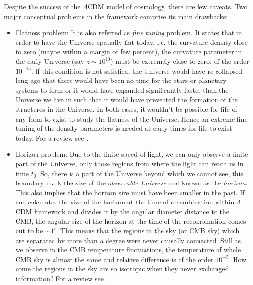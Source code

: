 Despite the success of the $\Lambda$CDM model of cosmology, there are few caveats.
Two major conceptual problems in the framework comprise its main drawbacks:

\begin{itemize}
	\item Flatness problem: It is also referred as {\it fine tuning} problem. It 
				states that in order to have the Universe spatially flat today, i.e.
				the curvature density close to zero (maybe within a margin of
				few percent), the curvature parameter in the early Universe (say 
				$z\sim10^{10}$) must be extremely close to zero, of the order $10^{-15}$.
				If this condition is not satisfied, the Universe would have re-collapsed
				long ago that there would have been no time for the stars or 
				planetary systems to form
				or it would have expanded significantly faster than the Universe
				we live in such that it would have prevented the formation of the structures
				in the Universe. In both cases, it wouldn't be possible for life
				of any form to exist to study the flatness of the Universe. Hence
				an extreme fine tuning of the density parameters is needed at early
				times for life to exist today. For a review see \cite{2012PASA...29..395K}.

	\item Horizon problem: Due to the finite speed of light, we can only observe
				a finite part of the Universe, 
				only those regions from where the light can reach us
				in time $t_0$. So, there is a part of the Universe beyond which
				we cannot see, this boundary mark the size of the {\it observable Universe}
				and known as the {\it horizon}. This also implies that the horizon
				size must have been smaller in the past. If one calculates the size of the
				horizon at the time of recombination within $\Lambda$CDM framework and
				divides it by the angular diameter distance to the CMB, the angular
				size of the horizon at the time of the recombination 
				comes out to be $\sim 1^{\circ}$. This means
				that the regions in the sky (or CMB sky) which are separated by 
				more than a degree were never causally connected. Still as
				we observe in the CMB temperature fluctuations, the temperature of
				whole CMB sky is almost the same and relative difference is of the 
				order $10^{-5}$. How come the regions in the sky are so isotropic
				when they never exchanged information? For a review see 
				\cite{2012PASA...29..395K}.
\end{itemize}


